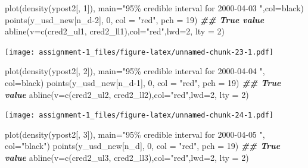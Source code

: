 \documentclass[
]{article}
\newenvironment{Shaded}{\begin{snugshade}}{\end{snugshade}}
\newcommand{\AttributeTok}[1]{\textcolor[rgb]{0.77,0.63,0.00}{#1}}
\newcommand{\DecValTok}[1]{\textcolor[rgb]{0.00,0.00,0.81}{#1}}
\newcommand{\DocumentationTok}[1]{\textcolor[rgb]{0.56,0.35,0.01}{\textbf{\textit{#1}}}}
\newcommand{\FunctionTok}[1]{\textcolor[rgb]{0.00,0.00,0.00}{#1}}
\newcommand{\NormalTok}[1]{#1}
\newcommand{\StringTok}[1]{\textcolor[rgb]{0.31,0.60,0.02}{#1}}
\begin{document}
\begin{Shaded}
\begin{Highlighting}[]
\FunctionTok{plot}\NormalTok{(}\FunctionTok{density}\NormalTok{(ypost2[, }\DecValTok{1}\NormalTok{]), }\AttributeTok{main=}\StringTok{"95\% credible interval for 2000{-}04{-}03 "}\NormalTok{,}\AttributeTok{col=}\StringTok{\textquotesingle{}black\textquotesingle{}}\NormalTok{)}
\FunctionTok{points}\NormalTok{(y\_usd\_new[n\_d}\DecValTok{{-}2}\NormalTok{], }\DecValTok{0}\NormalTok{, }\AttributeTok{col =} \StringTok{"red"}\NormalTok{, }\AttributeTok{pch =} \DecValTok{19}\NormalTok{) }\DocumentationTok{\#\# True value}
\FunctionTok{abline}\NormalTok{(}\AttributeTok{v=}\FunctionTok{c}\NormalTok{(cred2\_ul1, cred2\_ll1),}\AttributeTok{col=}\StringTok{"red"}\NormalTok{,}\AttributeTok{lwd=}\DecValTok{2}\NormalTok{, }\AttributeTok{lty =} \DecValTok{2}\NormalTok{)}
\end{Highlighting}
\end{Shaded}

\texttt{[image: assignment-1\_files/figure-latex/unnamed-chunk-23-1.pdf]}

\begin{Shaded}
\begin{Highlighting}[]
\FunctionTok{plot}\NormalTok{(}\FunctionTok{density}\NormalTok{(ypost2[, }\DecValTok{2}\NormalTok{]), }\AttributeTok{main=}\StringTok{"95\% credible interval for 2000{-}04{-}04 "}\NormalTok{, }\AttributeTok{col=}\StringTok{\textquotesingle{}black\textquotesingle{}}\NormalTok{)}
\FunctionTok{points}\NormalTok{(y\_usd\_new[n\_d}\DecValTok{{-}1}\NormalTok{], }\DecValTok{0}\NormalTok{, }\AttributeTok{col =} \StringTok{"red"}\NormalTok{, }\AttributeTok{pch =} \DecValTok{19}\NormalTok{) }\DocumentationTok{\#\# True value}
\FunctionTok{abline}\NormalTok{(}\AttributeTok{v=}\FunctionTok{c}\NormalTok{(cred2\_ul2, cred2\_ll2),}\AttributeTok{col=}\StringTok{"red"}\NormalTok{,}\AttributeTok{lwd=}\DecValTok{2}\NormalTok{, }\AttributeTok{lty =} \DecValTok{2}\NormalTok{)}
\end{Highlighting}
\end{Shaded}

\texttt{[image: assignment-1\_files/figure-latex/unnamed-chunk-24-1.pdf]}

\begin{Shaded}
\begin{Highlighting}[]
\FunctionTok{plot}\NormalTok{(}\FunctionTok{density}\NormalTok{(ypost2[, }\DecValTok{3}\NormalTok{]), }\AttributeTok{main=}\StringTok{"95\% credible interval for 2000{-}04{-}05 "}\NormalTok{, }\AttributeTok{col=}\StringTok{"black"}\NormalTok{)}
\FunctionTok{points}\NormalTok{(y\_usd\_new[n\_d], }\DecValTok{0}\NormalTok{, }\AttributeTok{col =} \StringTok{"red"}\NormalTok{, }\AttributeTok{pch =} \DecValTok{19}\NormalTok{) }\DocumentationTok{\#\# True value}
\FunctionTok{abline}\NormalTok{(}\AttributeTok{v=}\FunctionTok{c}\NormalTok{(cred2\_ul3, cred2\_ll3),}\AttributeTok{col=}\StringTok{"red"}\NormalTok{,}\AttributeTok{lwd=}\DecValTok{2}\NormalTok{, }\AttributeTok{lty =} \DecValTok{2}\NormalTok{)}
\end{Highlighting}
\end{Shaded}
\end{document}
